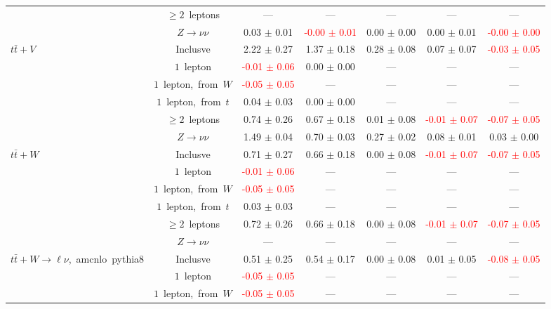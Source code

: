 \documentclass{article}
\begin{document}
\begin{longtable}{|l|c|c|c|c|c|c|}
 & $\ge2$~leptons  & ---  & ---  & ---  & ---  & --- \\* 
 & $Z\rightarrow\nu\nu$  & 0.03 $\pm$ 0.01  & \textcolor{red}{ -0.00 $\pm$ 0.01 }  & 0.00 $\pm$ 0.00  & 0.00 $\pm$ 0.01  & \textcolor{red}{ -0.00 $\pm$ 0.00 } \\* 
\hline 
\multirow{6}{*}{$t\bar{t}+V$} & Inclusve  & 2.22 $\pm$ 0.27  & 1.37 $\pm$ 0.18  & 0.28 $\pm$ 0.08  & 0.07 $\pm$ 0.07  & \textcolor{red}{ -0.03 $\pm$ 0.05 } \\* 
 & $1$~lepton  & \textcolor{red}{ -0.01 $\pm$ 0.06 }  & 0.00 $\pm$ 0.00  & ---  & ---  & --- \\* 
 & $1$~lepton,~from~$W$  & \textcolor{red}{ -0.05 $\pm$ 0.05 }  & ---  & ---  & ---  & --- \\* 
 & $1$~lepton,~from~$t$  & 0.04 $\pm$ 0.03  & 0.00 $\pm$ 0.00  & ---  & ---  & --- \\* 
 & $\ge2$~leptons  & 0.74 $\pm$ 0.26  & 0.67 $\pm$ 0.18  & 0.01 $\pm$ 0.08  & \textcolor{red}{ -0.01 $\pm$ 0.07 }  & \textcolor{red}{ -0.07 $\pm$ 0.05 } \\* 
 & $Z\rightarrow\nu\nu$  & 1.49 $\pm$ 0.04  & 0.70 $\pm$ 0.03  & 0.27 $\pm$ 0.02  & 0.08 $\pm$ 0.01  & 0.03 $\pm$ 0.00 \\* 
\hline 
\multirow{6}{*}{$t\bar{t}+W$} & Inclusve  & 0.71 $\pm$ 0.27  & 0.66 $\pm$ 0.18  & 0.00 $\pm$ 0.08  & \textcolor{red}{ -0.01 $\pm$ 0.07 }  & \textcolor{red}{ -0.07 $\pm$ 0.05 } \\* 
 & $1$~lepton  & \textcolor{red}{ -0.01 $\pm$ 0.06 }  & ---  & ---  & ---  & --- \\* 
 & $1$~lepton,~from~$W$  & \textcolor{red}{ -0.05 $\pm$ 0.05 }  & ---  & ---  & ---  & --- \\* 
 & $1$~lepton,~from~$t$  & 0.03 $\pm$ 0.03  & ---  & ---  & ---  & --- \\* 
 & $\ge2$~leptons  & 0.72 $\pm$ 0.26  & 0.66 $\pm$ 0.18  & 0.00 $\pm$ 0.08  & \textcolor{red}{ -0.01 $\pm$ 0.07 }  & \textcolor{red}{ -0.07 $\pm$ 0.05 } \\* 
 & $Z\rightarrow\nu\nu$  & ---  & ---  & ---  & ---  & --- \\* 
\hline 
\multirow{6}{*}{$t\bar{t}+W{\rightarrow}{\ell}{\nu}$,~amcnlo~pythia8} & Inclusve  & 0.51 $\pm$ 0.25  & 0.54 $\pm$ 0.17  & 0.00 $\pm$ 0.08  & 0.01 $\pm$ 0.05  & \textcolor{red}{ -0.08 $\pm$ 0.05 } \\* 
 & $1$~lepton  & \textcolor{red}{ -0.05 $\pm$ 0.05 }  & ---  & ---  & ---  & --- \\* 
 & $1$~lepton,~from~$W$  & \textcolor{red}{ -0.05 $\pm$ 0.05 }  & ---  & ---  & ---  & --- \\* 

\end{longtable}
\end{document}
